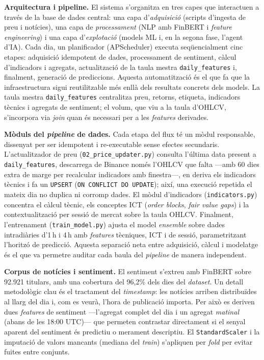 \documentclass[10pt,twocolumn,a4paper]{article}
\begin{document}
\textbf{Arquitectura i pipeline.} El sistema s'organitza en tres capes que
interactuen a través de la base de dades central: una capa d'\emph{adquisició}
(scripts d'ingesta de preu i notícies), una capa de \emph{processament} (NLP amb
FinBERT i \textit{feature engineering}) i una capa d'\emph{explotació} (models ML i,
en la segona fase, l'agent d'IA). Cada dia, un planificador (APScheduler) executa
seqüencialment cinc etapes: adquisició idempotent de dades, processament de
sentiment, càlcul d'indicadors i agregats, actualització de la taula mestra
\texttt{daily\_features} i, finalment, generació de prediccions. Aquesta automatització
és el que fa que la infraestructura sigui reutilitzable més enllà dels resultats
concrets dels models. La taula mestra \texttt{daily\_features} centralitza preu,
retorns, etiqueta, indicadors tècnics i agregats de sentiment; el volum, que viu a la
taula d'OHLCV, s'incorpora via \textit{join} quan és necessari per a les
\textit{features} derivades.

\textbf{Mòduls del \textit{pipeline} de dades.} Cada etapa del flux té un mòdul
responsable, dissenyat per ser idempotent i re-executable sense efectes secundaris.
L'actualitzador de preu (\texttt{02\_price\_updater.py}) consulta l'última data
present a \texttt{daily\_features}, descarrega de Binance només l'OHLCV que falta
---amb 60 dies extra de marge per recalcular indicadors amb finestra---, en deriva
els indicadors tècnics i fa un \texttt{UPSERT} (\texttt{ON CONFLICT DO UPDATE});
així, una execució repetida el mateix dia no duplica ni corromp dades. El mòdul
d'indicadors (\texttt{indicators.py}) concentra el càlcul tècnic, els conceptes ICT
(\textit{order blocks}, \textit{fair value gaps}) i la contextualització per sessió
de mercat sobre la taula OHLCV. Finalment, l'entrenament (\texttt{train\_model.py})
ajusta el model \textit{ensemble} sobre dades intradiàries d'1\,h i 4\,h amb
\textit{features} tècniques, ICT i de sessió, parametritzant l'horitzó de predicció.
Aquesta separació neta entre adquisició, càlcul i modelatge és el que va permetre
auditar cada baula del \textit{pipeline} de manera independent.

\textbf{Corpus de notícies i sentiment.} El sentiment s'extreu amb FinBERT sobre
92.921 titulars, amb una cobertura del 96,2\% dels dies del \textit{dataset}. Un
detall metodològic clau és el tractament del \textit{timestamp}: les notícies
arriben distribuïdes al llarg del dia i, com es veurà, l'hora de publicació importa.
Per això es deriven dues \textit{features} de sentiment ---l'agregat complet del dia
i un agregat \emph{matinal} (abans de les 18:00 UTC)--- que permeten contrastar
directament si el senyal aparent del sentiment és predictiu o merament descriptiu.
El \texttt{StandardScaler} i la imputació de valors mancants (mediana del
\textit{train}) s'apliquen per \textit{fold} per evitar fuites entre conjunts.
\end{document}
